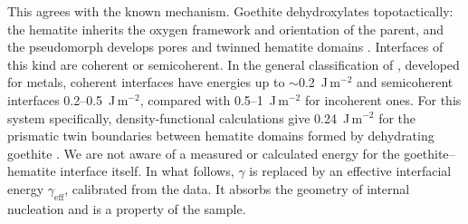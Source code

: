 This agrees with the known mechanism. Goethite dehydroxylates topotactically: the hematite
inherits the oxygen framework and orientation of the parent, and the pseudomorph develops pores
and twinned hematite domains \citep{limadefaria1963,watari1979,watari1983,cudennec2005}. Interfaces
of this kind are coherent or semicoherent. In the general classification of \citet{porter2009},
developed for metals, coherent interfaces have energies up to $\sim$0.2~J\,m$^{-2}$ and semicoherent
interfaces 0.2--0.5~J\,m$^{-2}$, compared with 0.5--1~J\,m$^{-2}$ for incoherent ones. For this system
specifically, density-functional calculations give 0.24~J\,m$^{-2}$ for the prismatic twin boundaries
between hematite domains formed by dehydrating goethite \citep{saito2016}. We are not aware of a
measured or calculated energy for the goethite--hematite interface itself. In what follows,
$\gamma$ is replaced by an effective interfacial energy $\gamma_{\mathrm{eff}}$, calibrated from the
data. It absorbs the geometry of internal nucleation and is a property of the sample.

